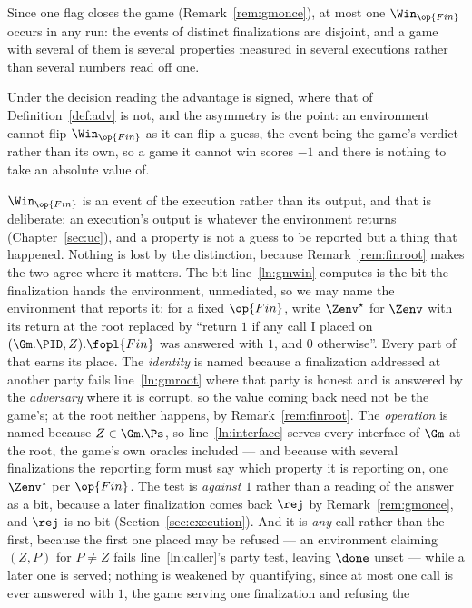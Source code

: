 \documentclass[10pt,oneside,openany]{book}
\theoremstyle{accentdef}
\theoremstyle{accentplain}
\begin{document}
Since one flag closes the game (Remark~\ref{rem:gmonce}), at most one $\Win_{\op{Fin}}$ occurs in
any run: the events of distinct finalizations are disjoint, and a game with several of them is
several properties measured in several executions rather than several numbers read off one.

Under the decision reading the advantage is signed, where that of Definition~\ref{def:adv} is not,
and the asymmetry is the point:
an environment cannot flip $\Win_{\op{Fin}}$ as it can flip a guess, the event being the game's
verdict rather than its own, so a game it cannot win scores $-1$ and there is nothing to take an
absolute value of.

$\Win_{\op{Fin}}$ is an event of the execution rather than its output, and that is deliberate: an
execution's
output is whatever the environment returns (Chapter~\ref{sec:uc}), and a property is not a guess to be
reported but a thing that happened. Nothing is lost by the distinction, because
Remark~\ref{rem:finroot} makes the two agree where it matters. The bit line~\ref{ln:gmwin} computes is
the bit the finalization hands the environment, unmediated, so we may name the environment that reports
it: for a fixed $\op{Fin}$, write $\Zenv^{\star}$ for $\Zenv$ with its return at the root replaced by
``return $1$ if any call I
placed on $(\Gm.\PID,Z).\fopl{Fin}$ was answered with $1$, and $0$ otherwise''. Every part of that
earns its place. The \emph{identity} is named because a finalization addressed at another party fails
line~\ref{ln:gmroot} where that party is honest and is answered by the \emph{adversary} where it is
corrupt, so the value coming back need not be the game's; at the root neither happens, by
Remark~\ref{rem:finroot}. The \emph{operation} is named because $Z \in \Gm.\Ps$, so
line~\ref{ln:interface} serves every interface of $\Gm$ at the root, the game's own oracles included
--- and because with several finalizations the reporting form must say which property it is reporting
on, one $\Zenv^{\star}$ per $\op{Fin}$.
The test is \emph{against $1$} rather than a reading of the answer as a bit, because a later
finalization comes back $\rej$ by Remark~\ref{rem:gmonce}, and $\rej$ is no bit
(Section~\ref{sec:execution}). And it is \emph{any} call rather than the first, because the first one
placed may be refused --- an environment claiming $(Z,P)$ for $P \neq Z$ fails line~\ref{ln:caller}'s
party test, leaving $\done$ unset --- while a later one is served; nothing is weakened by quantifying,
since at most one call is ever answered with $1$, the game serving one finalization and refusing the
\end{document}
